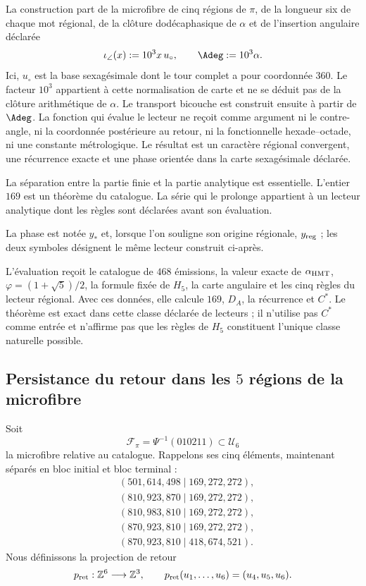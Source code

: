 La construction part de la microfibre de cinq régions de \(\pi\), de la
longueur six de chaque mot régional, de la clôture dodécaphasique de \(\alpha\)
et de l'insertion angulaire déclarée
\[
 \iota_\angle(x):=10^3x\,u_\circ,\qquad
 \Adeg:=10^3\alpha .
\]
Ici, \(u_\circ\) est la base sexagésimale dont le tour complet a pour
coordonnée \(360\).
Le facteur \(10^3\) appartient à cette normalisation de carte et ne se déduit pas de la
clôture arithmétique de \(\alpha\). Le transport bicouche est construit ensuite
à partir de \(\Adeg\). La fonction qui évalue le lecteur ne reçoit comme
argument ni le contre-angle, ni la coordonnée postérieure au retour, ni la fonctionnelle
hexade--octade, ni une constante métrologique. Le résultat est un caractère
régional convergent, une récurrence exacte et une phase orientée dans la carte
sexagésimale déclarée.

La séparation entre la partie finie et la partie analytique est essentielle. L'entier
\(169\) est un théorème du catalogue. La série qui le prolonge appartient
à un lecteur analytique dont les règles sont déclarées avant son évaluation.

La phase est notée \(y_*\) et, lorsque l'on souligne son origine régionale,
\(y_{\rm reg}\) ; les deux symboles désignent le même lecteur construit
ci-après.


L'évaluation reçoit le catalogue de \(468\) émissions, la valeur exacte de
\(\alpha_{\rm HMT}\), \(\varphi=(1+\sqrt5)/2\), la formule fixée de \(H_5\),
la carte angulaire et les cinq règles du lecteur régional. Avec ces données,
elle calcule \(169\), \(D_A\), la récurrence et \(C^*\). Le théorème est exact dans
cette classe déclarée de lecteurs ; il n'utilise pas \(C^*\) comme entrée et n'affirme pas que
les règles de \(H_5\) constituent l'unique classe naturelle possible.

\subsection{Persistance du retour dans les \texorpdfstring{\(5\)}{5} régions de la microfibre}
\label{sec:s102:c38:2:2}


Soit
\[
\mathcal F_\pi=\Psi^{-1}(010211)\subset\mathcal U_6
\]
la microfibre relative au catalogue. Rappelons ses cinq éléments, maintenant séparés en bloc initial et bloc terminal :
\[
\begin{aligned}
 &(501,614,498\mid169,272,272),\\
 &(810,923,870\mid169,272,272),\\
 &(810,983,810\mid169,272,272),\\
 &(870,923,810\mid169,272,272),\\
 &(870,923,810\mid418,674,521).
\end{aligned}
\]
Nous définissons la projection de retour
\[
p_{\rm ret}:\mathbb Z^6\longrightarrow\mathbb Z^3,
\qquad
p_{\rm ret}(u_1,\ldots,u_6)=(u_4,u_5,u_6).
\]

